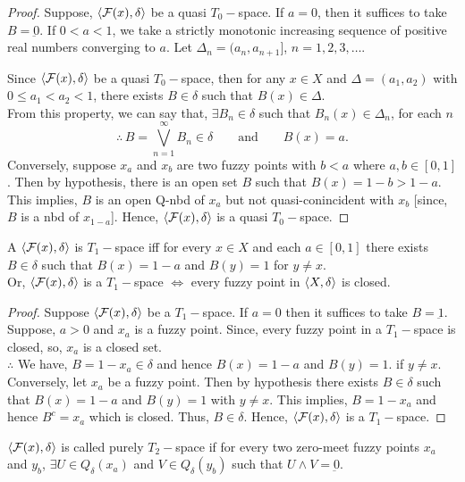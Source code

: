 \documentclass[../main-sheet.tex]{subfiles}
\begin{document}
\begin{proof}
    Suppose, \(\langle \mathcal{F}(x), \delta \rangle\) be a quasi \(T_0-\)space. If \(a=0\), then it suffices to take \(B=\underbar{0}\). If \(0<a<1\), we take a strictly monotonic increasing sequence of positive real numbers converging to \(a\). Let \(\Delta_n=(a_n,a_{n+1}]\), \(n=1,2,3,\dots\).

    Since \(\langle \mathcal{F}(x), \delta \rangle\) be a quasi \(T_0-\)space, then for any \(x\in X\) and \(\Delta=(a_1,a_2)\) with \(0\leq a_1<a_2<1\), there exists \(B\in\delta\) such that \(B(x)\in \Delta\).\\
    From this property, we can say that, \(\exists B_n\in\delta\) such that \(B_n(x)\in \Delta_n\), for each \(n\)
    \[\therefore\,B=\bigvee_{n=1}^\infty B_n\in \delta\qquad\text{and}\qquad B(x)=a.\]
    Conversely, suppose \(x_a\) and \(x_b\) are two fuzzy points with \(b<a\) where \(a,b\in[0,1]\). Then by hypothesis, there is an open set \(B\) such that \(B(x)=1-b>1-a\).\\
    This implies, \(B\) is an open Q-nbd of \(x_a\) but not quasi-conincident with \(x_b\) [since, \(B\) is a nbd of \(x_{1-a}\)]. Hence, \(\langle \mathcal{F}(x), \delta \rangle\) is a quasi \(T_0-\)space.
\end{proof}
\begin{thm}
    A \fts \(\langle \mathcal{F}(x), \delta \rangle\) is \(T_1-\)space iff for every \(x\in X\) and each \(a\in[0,1]\) there exists \(B\in\delta\) such that \(B(x)=1-a\) and \(B(y)=1\) for \(y\neq x\).\\
    Or, \(\langle \mathcal{F}(x), \delta \rangle\) is a \(T_1-\)space \(\Leftrightarrow\) every fuzzy point in \(\langle X, \delta \rangle\) is closed.
\end{thm}
\begin{proof}
    Suppose \(\langle \mathcal{F}(x), \delta \rangle\) be a \(T_1-\)space. If \(a=0\) then it suffices to take \(B=\underbar{1}\). Suppose, \(a>0\) and \(x_a\) is a fuzzy point. Since, every fuzzy point in a \(T_1-\)space is closed, so, \(x_a\) is a closed set.\\
    \(\therefore\) We have, \(B=1-x_a\in\delta\) and hence \(B(x)=1-a\) and \(B(y)=1\). if \(y\neq x\).\\
    Conversely, let \(x_a\) be a fuzzy point. Then by hypothesis there exists \(B\in\delta\) such that \(B(x)=1-a\) and \(B(y)=1\) with \(y\neq x\). This implies, \(B=1-x_a\) and hence \(B^c=x_a\) which is closed. Thus, \(B\in\delta\). Hence, \(\langle \mathcal{F}(x), \delta \rangle\) is a \(T_1-\)space.
\end{proof}
\begin{defn}
    \(\langle \mathcal{F}(x), \delta \rangle\) is called purely \(T_2-\)space if for every two zero-meet fuzzy points \(x_a\) and \(y_b\), \(\exists U\in Q_\delta(x_a)\) and \(V\in Q_\delta(y_b)\) such that \(U\wedge V=\underbar{0}\).
\end{defn}
\end{document}
